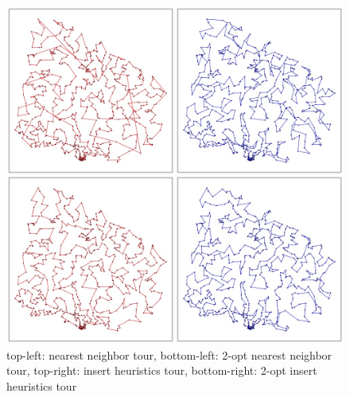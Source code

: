 \documentclass[11pt, oneside]{article}   	%
\begin{document}
\begin{figure}[!ht]
\centering
\includegraphics[width=140mm]{images/path-all.jpeg}
\caption{top-left: nearest neighbor tour, bottom-left: 2-opt nearest neighbor tour, top-right: insert heuristics tour, bottom-right: 2-opt insert heuristics tour}
\end{figure} 

\newpage

\end{document}
